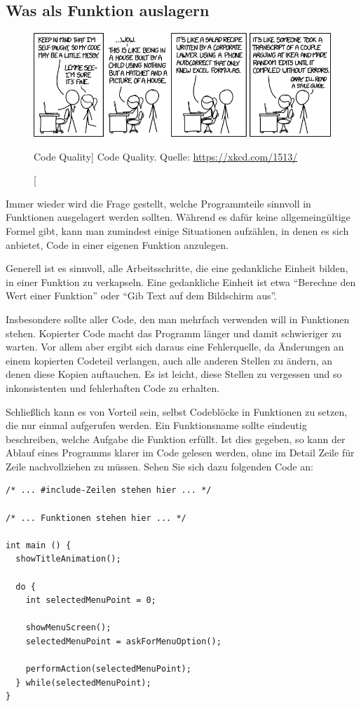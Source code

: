 \subsection{Was als Funktion auslagern}
\FloatBarrier
\begin{figure}
\begin{center}
\includegraphics[width=\linewidth]{./gfx/xkcd-codeQuality}
\caption
	[Code Quality]
	{Code Quality. Quelle: \url{https://xkcd.com/1513/}}
\end{center}
\end{figure}
Immer wieder wird die Frage gestellt, welche Programmteile sinnvoll in Funktionen ausgelagert werden sollten. Während es dafür keine allgemeingültige Formel gibt, kann man zumindest einige Situationen aufzählen, in denen es sich anbietet, Code in einer eigenen Funktion anzulegen.

Generell ist es sinnvoll, alle Arbeitsschritte, die eine gedankliche Einheit bilden, in einer Funktion zu verkapseln. Eine gedankliche Einheit ist etwa \enquote{Berechne den Wert einer Funktion} oder \enquote{Gib Text auf dem Bildschirm aus}.

Insbesondere sollte aller Code, den man mehrfach verwenden will in Funktionen stehen. Kopierter Code macht das Programm länger und damit schwieriger zu warten. Vor allem aber ergibt sich daraus eine Fehlerquelle, da Änderungen an einem kopierten Codeteil verlangen, auch alle anderen Stellen zu ändern, an denen diese Kopien auftauchen. Es ist leicht, diese Stellen zu vergessen und so inkonsistenten und fehlerhaften Code zu erhalten.

Schließlich kann es von Vorteil sein, selbst Codeblöcke in Funktionen zu setzen, die nur einmal aufgerufen werden. Ein Funktionsname sollte eindeutig beschreiben, welche Aufgabe die Funktion erfüllt. Ist dies gegeben, so kann der Ablauf eines Programms klarer im Code gelesen werden, ohne im Detail Zeile für Zeile nachvollziehen zu müssen. Sehen Sie sich dazu folgenden Code an:

\begin{codebox}
\begin{verbatim}
/* ... #include-Zeilen stehen hier ... */

/* ... Funktionen stehen hier ... */

int main () {
  showTitleAnimation();
  
  do {
    int selectedMenuPoint = 0;
    
    showMenuScreen();
    selectedMenuPoint = askForMenuOption();
    
    performAction(selectedMenuPoint);
  } while(selectedMenuPoint);
}
\end{verbatim}
\end{codebox}

